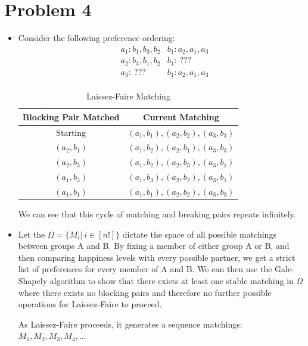 \documentclass[12pt]{article}
\begin{document}
\section*{Problem 4}
\begin{itemize}
    \item[a)] Consider the following preference ordering:
    \begin{align*}
        &a_1: b_1, b_3, b_2    &b_1: a_2, a_1, a_3\\
        &a_2: b_3, b_1, b_2    &b_1: ~???\\
        &a_3: ~???             &b_1: a_2, a_1, a_3\\
    \end{align*}

    \begin{table}[h!]
    \centering
    \caption{Laissez-Faire Matching}
    \label{tab:simple3col}
    \begin{tabular}{|c|c|}   
        \hline
        \textbf{Blocking Pair Matched} & \textbf{Current Matching} \\
        \hline
        Starting & $(a_1, b_1), (a_2, b_2),  (a_3, b_3)$ \\
        \hline
        $(a_2, b_1)$ & $(a_1, b_2), (a_2, b_1), (a_3, b_3)$ \\
        \hline
        $(a_2, b_3)$ & $(a_1, b_2), (a_2, b_3), (a_3, b_1)$ \\
        \hline
        $(a_1, b_3)$ & $(a_1, b_3), (a_2, b_2), (a_3, b_1)$ \\
        \hline
        $(a_1, b_1)$ & $(a_1, b_1), (a_2, b_2),  (a_3, b_3)$ \\
        \hline
    \end{tabular}
    \end{table}
    We can see that this cycle of matching and breaking pairs repeats infinitely.


    \item[b)] Let the $\Omega = \{M_i | ~i \in [n!]\}$ dictate the space of all possible matchings between groups A and B. By fixing a member of either group A or B, and then comparing happiness levels with every possible partner, we get a strict list of preferences for every member of A and B. We can then use the Gale-Shapely algorithm to show that there exists at least one stable matching in $\Omega$ where there exists no blocking pairs and therefore no further possible operations for Laissez-Faire to proceed. 
    
    As Laissez-Faire proceeds, it generates a sequence matchings: $M_1, M_2, M_3, M_4, \dots$
    

\end{itemize}
\end{document}
